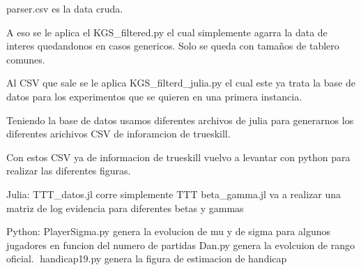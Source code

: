 parser.csv es la data cruda.

A eso se le aplica el KGS_filtered.py el cual simplemente agarra la data de interes quedandonos en casos genericos.
Solo se queda con tamaños de tablero comunes.

Al CSV que sale se le aplica KGS_filterd_julia.py el cual este ya trata la base de datos para
los experimentos que se quieren en una primera instancia.

Teniendo la base de datos usamos diferentes archivos de julia para generarnos los diferentes arichivos
CSV de inforamcion de trueskill.

Con estos CSV ya de informacion de trueskill vuelvo a levantar con python para realizar las diferentes figuras.

Julia:
TTT_datos.jl corre simplemente TTT
beta_gamma.jl va a realizar una matriz de log evidencia para diferentes betas y gammas

Python:
PlayerSigma.py genera la evolucion de mu y de sigma para algunos jugadores en funcion del numero de partidas
Dan.py genera la evolcuion de rango oficial.
handicap19.py genera la figura de estimacion  de handicap

